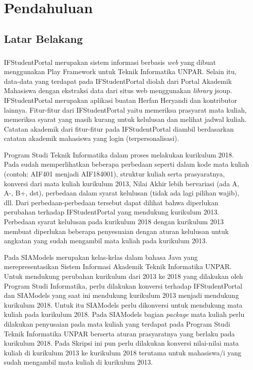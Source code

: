 \chapter{Pendahuluan}
\label{chap:intro}
   
\section{Latar Belakang}
\label{sec:label}

\paragraph{} IFStudentPortal\cite{ifstudentportal} merupakan sistem informasi berbasis  \textit{web} yang dibuat menggunakan Play Framework \cite{Leroux:2014} untuk Teknik Informatika UNPAR. Selain itu, data-data yang terdapat pada IFStudentPortal diolah dari Portal Akademik Mahasiswa dengan ekstraksi data dari situs web menggunakan \textit{library} jsoup. IFStudentPortal merupakan aplikasi buatan Herfan Heryandi dan kontributor lainnya. Fitur-fitur dari IFStudentPortal yaitu memeriksa prasyarat mata kuliah, memeriksa syarat yang masih kurang untuk kelulusan dan melihat jadwal kuliah. Catatan akademik dari fitur-fitur pada IFStudentPortal diambil berdasarkan catatan akademik mahasiswa yang login (terpersonalisasi).

Program Studi Teknik Informatika dalam proses melakukan kurikulum 2018. Pada \cite{dokumenkurikulum2018} sudah memperlihatkan beberapa perbedaan seperti dalam kode mata kuliah (contoh: AIF401 menjadi AIF184001), struktur kuliah serta prasyaratnya, konversi dari mata kuliah kurikulum 2013, Nilai Akhir lebih bervariasi (ada A, A-, B+, dst), perbedaan dalam syarat kelulusan (tidak ada lagi pilihan wajib), dll. Dari perbedaan-perbedaan tersebut dapat dilihat bahwa diperlukan perubahan terhadap IFStudentPortal yang mendukung kurikulum 2013. Perbedaan syarat kelulusan pada kurikulum 2018 dengan kurikulum 2013 membuat diperlukan beberapa penyesuaian dengan aturan kelulusan untuk angkatan yang sudah mengambil mata kuliah pada kurikulum 2013.

Pada SIAModels\cite{siamodels} merupakan kelas-kelas dalam bahasa Java yang merepresentasikan Sistem Informasi Akademik Teknik Informatika UNPAR. Untuk mendukung perubahan kurikulum dari 2013 ke 2018 yang dilakukan oleh Program Studi Informatika, perlu dilakukan konversi terhadap IFStudentPortal dan SIAModels yang saat ini mendukung kurikulum 2013 menjadi mendukung kurikulum 2018.  Untuk itu SIAModels perlu dikonversi untuk mendukung mata kuliah pada kurikulum 2018. Pada SIAModels bagian \textit{package} mata kuliah perlu dilakukan penyusaian pada mata kuliah yang terdapat pada Program Studi Teknik Informatika UNPAR berserta aturan prasyaratnya yang berlaku pada kurikulum 2018. Pada Skripsi ini pun perlu dilakukan konversi nilai-nilai mata kuliah di kurikulum 2013 ke kurikulum 2018 terutama untuk mahasiswa/i yang sudah mengambil mata kuliah di kurikulum 2013.

